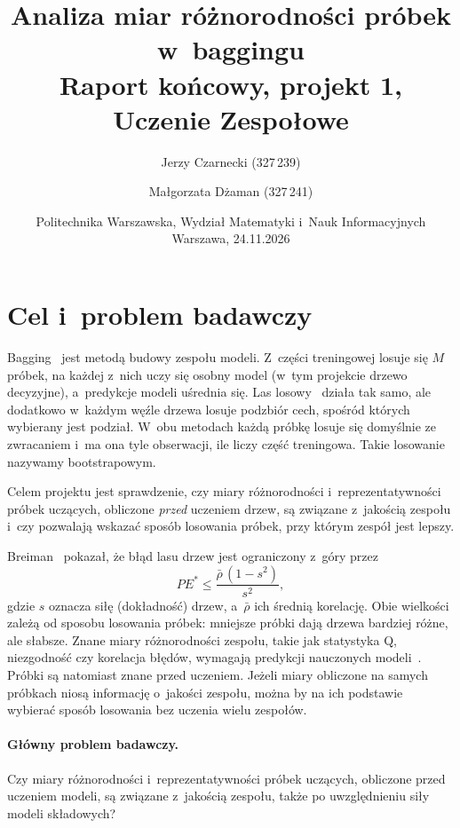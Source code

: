 \documentclass[11pt,a4paper]{article}
\title{Analiza miar różnorodności próbek w~baggingu\\[4pt]
\large Raport końcowy, projekt 1, Uczenie Zespołowe}
\author{Jerzy Czarnecki (327\,239) \and Małgorzata Dżaman (327\,241)}
\date{Politechnika Warszawska, Wydział Matematyki i~Nauk Informacyjnych\\
Warszawa, 24.11.2026}
\begin{document}
\maketitle

\begin{abstract}
\noindent

\end{abstract}

\tableofcontents
\newpage

\section{Cel i~problem badawczy}
\label{sec:cel}

Bagging~\cite{breiman1996} jest metodą budowy zespołu modeli. Z~części treningowej losuje się $M$ próbek, na każdej z~nich uczy się osobny model (w~tym projekcie drzewo decyzyjne), a~predykcje modeli uśrednia się. Las losowy~\cite{breiman2001} działa tak samo, ale dodatkowo w~każdym węźle drzewa losuje podzbiór cech, spośród których wybierany jest podział. W~obu metodach każdą próbkę losuje się domyślnie ze zwracaniem i~ma ona tyle obserwacji, ile liczy część treningowa. Takie losowanie nazywamy bootstrapowym.

Celem projektu jest sprawdzenie, czy miary różnorodności i~reprezentatywności próbek uczących, obliczone \emph{przed} uczeniem drzew, są związane z~jakością zespołu i~czy pozwalają wskazać sposób losowania próbek, przy którym zespół jest lepszy.

Breiman~\cite{breiman2001} pokazał, że błąd lasu drzew jest ograniczony z~góry przez
\[
PE^{*} \le \frac{\bar{\rho}\,(1-s^{2})}{s^{2}},
\]
gdzie $s$ oznacza siłę (dokładność) drzew, a~$\bar{\rho}$ ich średnią korelację. Obie wielkości zależą od sposobu losowania próbek: mniejsze próbki dają drzewa bardziej różne, ale słabsze. Znane miary różnorodności zespołu, takie jak statystyka Q, niezgodność czy korelacja błędów, wymagają predykcji nauczonych modeli~\cite{kuncheva2003,brown2005}. Próbki są natomiast znane przed uczeniem. Jeżeli miary obliczone na samych próbkach niosą informację o~jakości zespołu, można by na ich podstawie wybierać sposób losowania bez uczenia wielu zespołów.

\paragraph{Główny problem badawczy.} Czy miary różnorodności i~reprezentatywności próbek uczących, obliczone przed uczeniem modeli, są związane z~jakością zespołu, także po uwzględnieniu siły modeli składowych?
\end{document}
